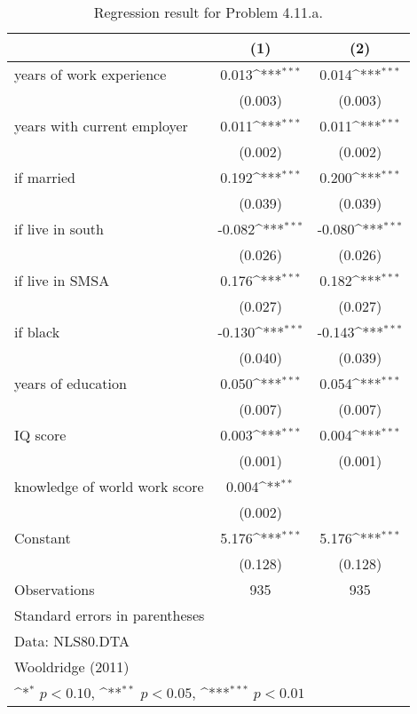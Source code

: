 \begin{table}[htbp]\centering
\def\sym#1{\ifmmode^{#1}\else\(^{#1}\)\fi}
\caption{Regression result for Problem 4.11.a. \label{reg1}}
\begin{tabular}{l*{2}{c}}
\toprule
                    &\multicolumn{1}{c}{(1)}         &\multicolumn{1}{c}{(2)}         \\
\midrule
years of work experience&       0.013\sym{***}&       0.014\sym{***}\\
                    &     (0.003)         &     (0.003)         \\
\addlinespace
years with current employer&       0.011\sym{***}&       0.011\sym{***}\\
                    &     (0.002)         &     (0.002)         \\
\addlinespace
=1 if married       &       0.192\sym{***}&       0.200\sym{***}\\
                    &     (0.039)         &     (0.039)         \\
\addlinespace
=1 if live in south &      -0.082\sym{***}&      -0.080\sym{***}\\
                    &     (0.026)         &     (0.026)         \\
\addlinespace
=1 if live in SMSA  &       0.176\sym{***}&       0.182\sym{***}\\
                    &     (0.027)         &     (0.027)         \\
\addlinespace
=1 if black         &      -0.130\sym{***}&      -0.143\sym{***}\\
                    &     (0.040)         &     (0.039)         \\
\addlinespace
years of education  &       0.050\sym{***}&       0.054\sym{***}\\
                    &     (0.007)         &     (0.007)         \\
\addlinespace
IQ score            &       0.003\sym{***}&       0.004\sym{***}\\
                    &     (0.001)         &     (0.001)         \\
\addlinespace
knowledge of world work score&       0.004\sym{**} &                     \\
                    &     (0.002)         &                     \\
\addlinespace
Constant            &       5.176\sym{***}&       5.176\sym{***}\\
                    &     (0.128)         &     (0.128)         \\
\midrule
Observations        &         935         &         935         \\
\bottomrule
\multicolumn{3}{l}{\footnotesize Standard errors in parentheses}\\
\multicolumn{3}{l}{\footnotesize Data: NLS80.DTA}\\
\multicolumn{3}{l}{\footnotesize Wooldridge (2011)}\\
\multicolumn{3}{l}{\footnotesize \sym{*} \(p<0.10\), \sym{**} \(p<0.05\), \sym{***} \(p<0.01\)}\\
\end{tabular}
\end{table}
